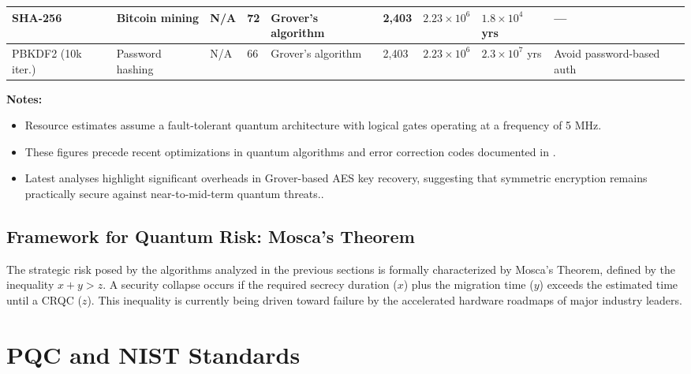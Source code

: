 \documentclass[11pt,a4paper]{article}
\begin{document}
\begin{landscape}
\begin{table}[ht]
\begin{tabular}{|p{2.5cm}|p{2.0cm}|p{1.0cm}|p{1.5cm}|p{2cm}|p{1.4cm}|p{1.6cm}|p{2.5cm}|p{2.5cm}|}
SHA-256 &
Bitcoin \hspace{5mm}mining &
N/A &
72 &
Grover’s \hspace{5mm}algorithm &
2,403 &
$2.23\times10^{6}$ &
$1.8\times10^{4}$ yrs &
--- \\ \hline

PBKDF2 \hspace{5mm}(10k iter.) &
Password hashing &
N/A &
66 &
Grover’s \hspace{5mm}algorithm &
2,403 &
$2.23\times10^{6}$ &
$2.3\times10^{7}$ yrs &
Avoid password-based auth \\ \hline

\end{tabular}
\end{table}

\textbf{Notes:}
\begin{itemize}[leftmargin=*]
\item Resource estimates assume a fault-tolerant quantum architecture with logical gates operating at a frequency of 5 MHz.
\item These figures precede recent optimizations in quantum algorithms and error correction codes documented in \cite{gidney2025,webster2026}.
\item Latest analyses highlight significant overheads in Grover-based AES key recovery, suggesting that symmetric encryption remains practically secure against near-to-mid-term quantum threats.\cite{grovercost}.
\end{itemize}
\end{landscape}
\subsection{Framework for Quantum Risk: Mosca’s Theorem}
The strategic risk posed by the algorithms analyzed in the previous sections is formally characterized by Mosca’s Theorem, defined by the inequality $x + y > z$. A security collapse occurs if the required secrecy duration ($x$) plus the migration time ($y$) exceeds the estimated time until a CRQC ($z$).\cite{Mosca2018} This inequality is currently being driven toward failure by the accelerated hardware roadmaps of major industry leaders.
\section{PQC and NIST Standards}
\end{document}
